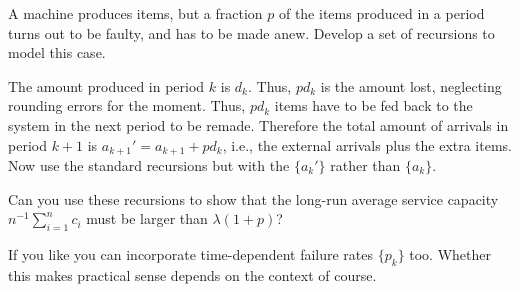 \begin{extra}
  A machine produces items, but a fraction $p$ of the items produced in a period turns out to be faulty, and has to be made anew.
  Develop a set of recursions to model this case.
  \begin{solution}
    The amount produced in period $k$ is $d_k$. Thus, $p d_k$ is the
    amount lost, neglecting rounding errors for the moment. Thus,
    $p d_k$ items have to be fed back to the system in the next period
    to be remade. Therefore the total amount of arrivals in period
    $k+1$ is $a_{k+1}'=a_{k+1}+pd_k$, i.e., the external arrivals plus
    the extra items. Now use the standard recursions but with the
    $\{a_{k}'\}$ rather than $\{a_k\}$.

    Can you use these recursions to show that the long-run average
    service capacity $n^{-1}\sum_{i=1}^n c_i$ must be larger than
    $\lambda(1+p)$?

    If you like you can incorporate time-dependent failure rates
    $\{p_k\}$ too. Whether this makes practical sense depends on the
    context of course.
      \end{solution}
\end{extra}

